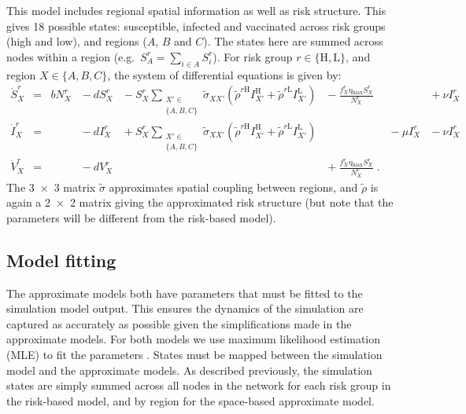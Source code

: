This model includes regional spatial information as well as risk structure. This gives 18 possible states: susceptible, infected and vaccinated across risk groups (high and low), and regions ($A$, $B$ and $C$). The states here are summed across nodes within a region (e.g.\ $S^r_A = \sum_{i\in{}A}S^r_i$). For risk group $r\in{}\{\mathrm{H,L}\}$, and region $X\in{}\{A,B,C\}$, the system of differential equations is given by:
\begin{subequations}
    \begin{alignat}{7}
        \dot{S}^r_X &={} &bN^r_X &{}-{} dS^r_X &{}-{} S^r_X\sum_{\substack{X'\in\\\{A,B,C\}}}\tilde{\sigma}_{XX'}\left(\tilde{\rho}^{r\mathrm{H}}I^{\mathrm{H}}_{X'} + \tilde{\rho}^{r\mathrm{L}}I^{\mathrm{L}}_{X'}\right) &{}-{} \frac{f^r_X\eta{}_\mathrm{max}S^r_X}{N^r_X} &&{}+{} \nu{}I^r_X \\
        \dot{I}^r_X &={}  &&{}-{} dI^r_X &{}+{} S^r_X\sum_{\substack{X'\in\\\{A,B,C\}}}\tilde{\sigma}_{XX'}\left(\tilde{\rho}^{r\mathrm{H}}I^{\mathrm{H}}_{X'} + \tilde{\rho}^{r\mathrm{L}}I^{\mathrm{L}}_{X'}\right)& &{}-{} \mu{}I^r_X &{}-{} \nu{}I^r_X \\
        \dot{V}^r_X &={}  &&{}-{} dV^r_X &&{}+{} \frac{f^r_X\eta{}_\mathrm{max}S^r_X}{N^r_X}\;.
    \end{alignat}
    \label{eq:space_model}
\end{subequations}
The \num{3x3} matrix $\tilde{\sigma}$ approximates spatial coupling between regions, and $\tilde{\rho}$ is again a \num{2x2} matrix giving the approximated risk structure (but note that the parameters will be different from the risk-based model).

\subsection{Model fitting\label{sec:ch4:model_fitting}}

The approximate models both have parameters that must be fitted to the simulation model output. This ensures the dynamics of the simulation are captured as accurately as possible given the simplifications made in the approximate models. For both models we use maximum likelihood estimation (MLE) to fit the parameters \citep{aldrich_ra_1997}. States must be mapped between the simulation model and the approximate models. As described previously, the simulation states are simply summed across all nodes in the network for each risk group in the risk-based model, and by region for the space-based approximate model.

